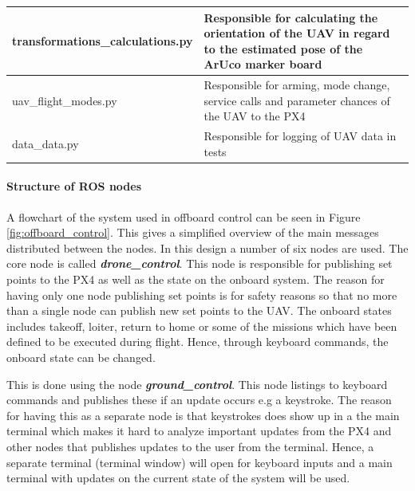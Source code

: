 \documentclass[../Head/report.tex]{subfiles}
\begin{document}
\begin{table}[H]
\begin{center}
\begin{tabularx}{\textwidth}[t]{XX}
\hline
transformations\_calculations.py &
\begin{minipage}[t]{\linewidth}%
Responsible for calculating the orientation of the UAV in regard to the estimated pose of the ArUco marker board   
\end{minipage}\vspace{0.5em}\\

\hline
uav\_flight\_modes.py &
\begin{minipage}[t]{\linewidth}%
Responsible for arming, mode change, service calls and parameter chances of the UAV to the PX4    
\end{minipage}\vspace{0.5em}\\

\hline
data\_data.py &
\begin{minipage}[t]{\linewidth}%
Responsible for logging of UAV data in tests   
\end{minipage}\\
\end{tabularx}
\end{center}
\end{table}


\renewcommand{\arraystretch}{1.0}



\paragraph{Structure of ROS nodes}
\label{sec:structure_of_ros_nodes}

A flowchart of the system used in offboard control can be seen in Figure \ref{fig:offboard_control}. This gives a simplified overview of the main messages distributed between the nodes. In this design a number of six nodes are used. The core node is called \textit{\textbf{drone\_control}}. This node is responsible for publishing set points to the PX4 as well as the state on the onboard system. The reason for having only one node publishing set points is for safety reasons so that no more than a single node can publish new set points to the UAV. The onboard states includes takeoff, loiter, return to home or some of the missions which have been defined to be executed during flight. Hence, through keyboard commands, the onboard state can be changed. 

This is done using the node \textit{\textbf{ground\_control}}. This node listings to keyboard commands and publishes these if an update occurs e.g a keystroke. The reason for having this as a separate node is that keystrokes does show up in a the main terminal which makes it hard to analyze important updates from the PX4 and other nodes that publishes updates to the user from the terminal. Hence, a separate terminal (terminal window) will open for keyboard inputs and a main terminal with updates on the current state of the system will be used. 
\end{document}
